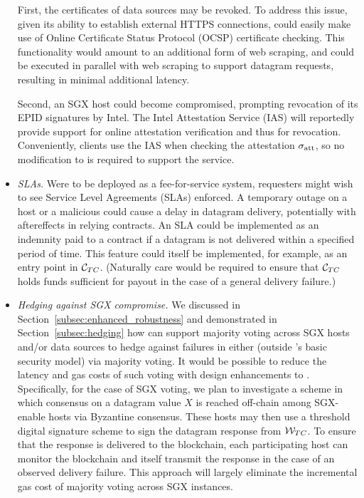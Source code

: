 \begin{itemize}
First, the certificates of data sources may be revoked. To address this issue, given its ability to establish external HTTPS connections, \tc could easily make use of Online Certificate Status Protocol (OCSP) certificate checking. This functionality would amount to an additional form of web scraping, and could be executed in parallel with web scraping to support datagram requests, resulting in minimal additional latency.

Second, an SGX host could become compromised, prompting revocation of its EPID signatures by Intel. The Intel Attestation Service (IAS) will reportedly provide support for online attestation verification and thus for revocation. Conveniently, clients use the IAS when checking the attestation ${\sigma_{\textrm{att}}}$, so no modification to \tc is required to support the service.


\item{\em SLAs.} Were \tc to be deployed as a fee-for-service system, requesters might wish to see Service Level Agreements (SLAs) enforced. A temporary outage on a \tc host or a malicious \medname could cause a delay in datagram delivery, potentially with aftereffects in relying contracts. An SLA could be implemented as an indemnity paid to a contract if a datagram is not delivered within a specified period of time. This feature could itself be implemented, for example, as an entry point in ${\cal C}_{TC}$. (Naturally care would be required to ensure that ${\cal C}_{TC}$ holds funds sufficient for payout in the case of a general delivery failure.)

\item{\em Hedging against SGX compromise.} We discussed in Section~\ref{subsec:enhanced_robustness} and demonstrated in Section~\ref{subsec:hedging} how \tc can support majority voting across SGX hosts and/or data sources to hedge against failures in either (outside \tc's basic security model) via majority voting. It would be possible to reduce the latency and gas costs of such voting with design enhancements to \tc. Specifically, for the case of SGX voting, we plan to investigate a scheme in which consensus on a datagram value $X$ is reached off-chain among SGX-enable \tc hosts  via Byzantine consensus. These hosts may then use a threshold digital signature scheme to sign the datagram response from ${\cal W}_{TC}$. To ensure that the response is delivered to the blockchain, each participating host can monitor the blockchain and itself transmit the response in the case of an observed delivery failure. This approach will largely eliminate the incremental gas cost of majority voting across SGX instances.

\end{itemize}

